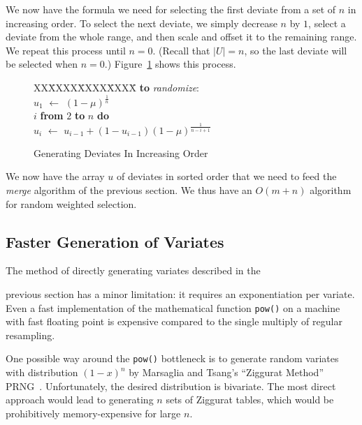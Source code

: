 \documentclass{article}
\newcommand{\asgn}{\,\,\leftarrow\,\,}
\begin{document}
  We now have the formula we need for selecting the first
  deviate from a set of $n$ in increasing order.  To select
  the next deviate, we simply decrease $n$ by $1$, select a
  deviate from the whole range, and then scale and offset it
  to the remaining range.  We repeat this process until
  $n=0$.  (Recall that $|U|=n$, so the last deviate will be
  selected when $n=0$.)  Figure~\ref{fig:deviate} shows
  this process.
  
  \begin{figure}
    \centering
    \begin{minipage}[b]{\linewidth}
      \begin{tabbing}
      XX\=XXXX\=XXXX\=XXXX\=\kill
      {\bf to} {\it randomize}: \\
      \>$u_1 \asgn (1-\mu)^{\frac{1}{n}}$ \\
       $i$ {\bf from} $2$ {\bf to} $n$ {\bf do} \\
      \>\>$u_i \asgn u_{i-1} + (1-u_{i-1})(1-\mu)^{\frac{1}{n-i+1}}$
    \end{tabbing}
    \end{minipage}
    \caption{Generating Deviates In Increasing Order}\label{fig:deviate}
  \end{figure}

  We now have the array $u$ of deviates in sorted order that
  we need to feed the {\em merge} algorithm of the previous
  section.  We thus have an $O(m + n)$ algorithm for random
  weighted selection.

\subsection{Faster Generation of Variates}

  The method of directly generating variates described in the

  previous section has a minor limitation: it requires an
  exponentiation per variate.  Even a fast implementation of
  the mathematical function {\tt pow()} on a machine with
  fast floating point is expensive compared to the single
  multiply of regular resampling.

  One possible way around the {\tt pow()} bottleneck is to generate
  random variates with distribution $(1 - x)^n$ by
  Marsaglia and
  Tsang's ``Ziggurat Method'' PRNG~\cite{ziggurat}.
  Unfortunately, the desired
  distribution is bivariate.  The most direct
  approach would lead to generating $n$ sets of Ziggurat
  tables, which would be prohibitively memory-expensive for
  large $n$.
\end{document}
